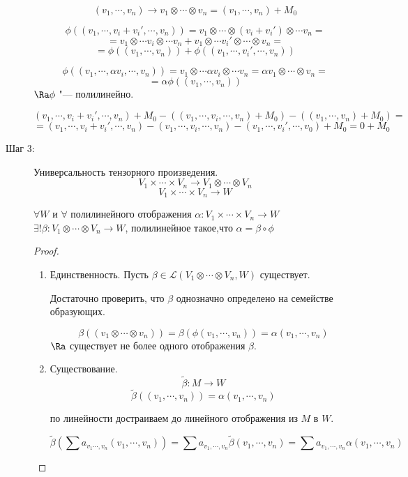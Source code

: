 \begin{description}
    $$(v_1, \cdots, v_n) \to v_1 \otimes \cdots \otimes v_n = (v_1, \cdots, v_n) + M_0$$

    $$\phi((v_1, \cdots, v_i + v_i', \cdots, v_n)) = v_1 \otimes \cdots \otimes (v_i + v_i') \otimes \cdots v_n =$$
    $$= v_1 \otimes \cdots v_i \otimes \cdots v_n + v_1 \otimes \cdots v_i' \otimes \cdots \otimes v_n  = $$
    $$ = \phi ((v_1, \cdots, v_n)) + \phi((v_1, \cdots, v_i', \cdots, v_n))$$

    $$\phi((v_1, \cdots, \alpha v_i, \cdots, v_n)) = v_1 \otimes \cdots \alpha v_i \otimes \cdots v_n = \alpha v_1 \otimes \cdots \otimes v_n = $$
    $$= \alpha \phi((v_1, \cdots, v_n))$$
    $\Ra \phi$ "--- полилинейно. 

    $$(v_1, \cdots, v_i + v_i', \cdots, v_n) + M_0 - ((v_1, \cdots, v_i, \cdots, v_n) + M_0) - ((v_1,\cdots, v_n) + M_0) =$$
    $$= (v_1, \cdots, v_i + v_i',  \cdots, v_n) - (v_1, \cdots, v_i, \cdots, v_n) -  (v_1, \cdots, v_i', \cdots, v_0) + M_0 = 0 + M_0$$
    \item[Шаг 3:] Универсальность тензорного произведения. 
    $$V_1 \times \cdots \times V_n \to  V_1 \otimes \cdots \otimes V_n$$
    $$V_1 \times \cdots \times V_n \to W $$
    \begin{theorem}
    $\forall W$ и $\forall$ полилинейного отображения $\alpha \colon V_1 \times \cdots \times V_n \to W$
    $\exists ! \beta \colon V_1 \otimes \cdots \otimes V_n \to W$, полилинейное такое,что $\alpha = \beta \circ \phi$
    \end{theorem}
    \begin{proof}
    \begin{enumerate}
    \item Единственность. 
    Пусть $\beta \in \mathscr{L}(V_1 \otimes \cdots \otimes V_n, W)$  существует. 
                              
    Достаточно проверить, что $\beta$ однозначно определено на семействе образующих. 

    $$\beta((v_1\otimes \cdots \otimes v_n)) = \beta (\phi(v_1, \cdots, v_n)) = \alpha (v_1, \cdots, v_n)$$
    $\Ra$ существует не более одного отображения $\beta$.
    \item Существование. 
         $$\tilde{\beta} \colon M \to W$$
         $$\tilde{\beta} ((v_1, \cdots, v_n)) = \alpha(v_1, \cdots, v_n)$$

         по линейности достраиваем до линейного отображения из $M$ в $W$.

         $$\tilde{\beta}(\sum a_{v_1 \cdots, v_n}(v_1, \cdots, v_n)) = \sum a_{v_1, \cdots, v_n} \tilde{\beta}(v_1, \cdots, v_n) = \sum a_{v_1, \cdots, v_n}\alpha(v_1, \cdots, v_n)$$


\end{enumerate}
\end{proof}
\end{description}
